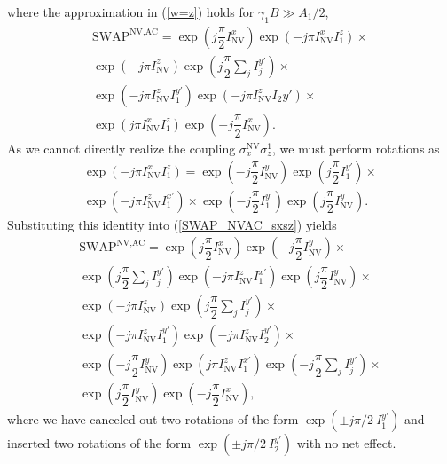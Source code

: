 \documentclass[twocolumn]{revtex4}
\renewcommand{\t}{\text} %
\newcommand{\f}[2]{\dfrac{#1}{#2}} %
\newcommand{\p}[1]{\left(#1\right)} %
\newcommand{\SWAP}{\t{SWAP}}
\newcommand{\NV}{\t{NV}}
\newcommand{\AC}{\t{AC}}
\begin{document}
where the approximation in (\ref{w=z}) holds for $\gamma_1B\gg A_1/2$,
\begin{multline}
  \SWAP^{\NV,\AC} = \exp\p{j\f\pi2 I_\NV^x}
  \exp\p{-j\pi I_\NV^x I_1^z}
  \times \\
  \exp\p{-j\pi I_\NV^z} \exp\p{j\f\pi2\sum_jI_j^{y'}}
  \times \\
  \exp\p{-j\pi I_\NV^z I_1^{y'}}
  \exp\p{-j\pi I_\NV^z I_2{y'}}
  \times \\
  \exp\p{j\pi I_\NV^x I_1^z} \exp\p{-j\f\pi2 I_\NV^x}.
  \label{SWAP_NVAC_sxsz}
\end{multline}
As we cannot directly realize the coupling $\sigma_x^\NV\sigma_z^1$,
we must perform rotations as
\begin{multline}
  \exp\p{-j\pi I_\NV^x I_1^z} =
  \exp\p{-j\f\pi2 I_\NV^y} \exp\p{j\f\pi2 I_1^{y'}}
  \times \\
  \exp\p{-j\pi I_\NV^z I_1^{x'}}
  \times \exp\p{-j\f\pi2 I_1^{y'}} \exp\p{j\f\pi2 I_\NV^y}.
\end{multline}
Substituting this identity into (\ref{SWAP_NVAC_sxsz}) yields
\begin{multline}
  \SWAP^{\NV,\AC} = \exp\p{j\f\pi2 I_\NV^x}
  \exp\p{-j\f\pi2 I_\NV^y}
  \times \\
  \exp\p{j\f\pi2\sum_jI_j^{y'}}
  \exp\p{-j\pi I_\NV^z I_1^{x'}}
  \exp\p{j\f\pi2 I_\NV^y}
  \times \\
  \exp\p{-j\pi I_\NV^z} \exp\p{j\f\pi2\sum_jI_j^{y'}}
  \times \\
  \exp\p{-j\pi I_\NV^z I_1^{y'}}
  \exp\p{-j\pi I_\NV^z I_2^{y'}}
  \times \\
  \exp\p{-j\f\pi2 I_\NV^y}
  \exp\p{j\pi I_\NV^z I_1^{x'}}
  \exp\p{-j\f\pi2\sum_jI_j^{y'}}
  \times \\
  \exp\p{j\f\pi2 I_\NV^y} \exp\p{-j\f\pi2 I_\NV^x},
  \label{SWAP_NVAC}
\end{multline}
where we have canceled out two rotations of the form
$\exp\p{\pm j\pi/2~I_1^{y'}}$ and inserted two rotations of the
form $\exp\p{\pm j\pi/2~I_2^{y'}}$ with no net effect.
\end{document}
